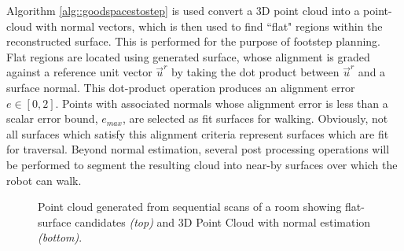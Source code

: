 			Algorithm \ref{alg::goodspacestostep} is used convert a 3D point cloud into a point-cloud with normal vectors, which is then used to find ``flat" regions within the reconstructed surface. This is performed for the purpose of footstep planning. Flat regions are located using generated surface, whose alignment is graded against a reference unit vector $\vec{u}^{r}$ by taking the dot product between  $\vec{u}^{r}$ and a surface normal. This dot-product operation produces an alignment error $e\in[0,2]$. Points with associated normals whose alignment error is less than a scalar error bound, $e_{max}$, are selected as fit surfaces for walking. Obviously, not all surfaces which satisfy this alignment criteria represent surfaces which are fit for traversal. Beyond normal estimation, several post processing operations will be performed to segment the resulting cloud into near-by surfaces over which the robot can walk. 

			\begin{figure}[!h]
				\centering
				\caption{Point cloud generated from sequential scans of a room showing flat-surface candidates \emph{(top)} and 3D Point Cloud with normal estimation \emph{(bottom)}.}
				\label{fig::surface_estimation}
			\end{figure}